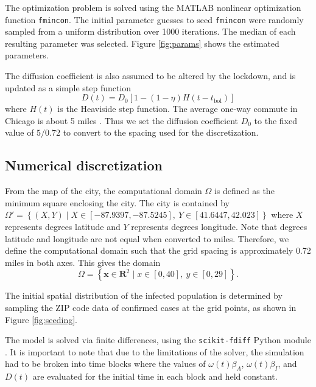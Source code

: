 \documentclass[11pt]{article}
\newcommand{\R}{\mathbf{R}}
\renewcommand\vec{\mathbf}
\begin{document}
		The optimization problem is solved using the MATLAB nonlinear optimization function \verb|fmincon|.
		The initial parameter guesses to seed \verb|fmincon| were randomly sampled from a uniform distribution over 1000 iterations.
		The median of each resulting parameter was selected.
		Figure \ref{fig:params} shows the estimated parameters.
		
		The diffusion coefficient is also assumed to be altered by the lockdown, and is updated as a simple step function
			\begin{equation} \label{eq:diffusion}
				D(t) = D_0 \left[ 1 - (1 - \eta) H (t - t_\mathrm{bol}) \right]
			\end{equation}
		where $H(t)$ is the Heaviside step function.
		The average one-way commute in Chicago is about 5 miles \cite{travel}.
		Thus we set the diffusion coefficient $D_0$ to the fixed value of $5 / 0.72$ to convert to the spacing used for the discretization.
	
	\subsection{Numerical discretization}
		From the map of the city, the computational domain $\Omega$ is defined as the minimum square enclosing the city.
		The city is contained by $\Omega' = \left\{ (X,Y) \mid X \in [-87.9397, -87.5245], \ Y \in [41.6447, 42.023] \right\}$ where $X$ represents degrees latitude and $Y$ represents degrees longitude.
		Note that degrees latitude and longitude are not equal when converted to miles.
		Therefore, we define the computational domain such that the grid spacing is approximately 0.72 miles in both axes.
		This gives the domain
		\begin{equation*} \label{eq:domain}
			\Omega = \left\{ \vec{x} \in \R^2 \mid x \in [0, 40], \ y \in [0, 29] \right\}.
		\end{equation*}
		
		The initial spatial distribution of the infected population is determined by sampling the ZIP code data of confirmed cases \cite{Chicago-zips} at the grid points, as shown in Figure \ref{fig:seeding}.
		
		The model is solved via finite differences, using the \verb|scikit-fdiff| Python module \cite{nicolas_cellier_2019_3236970}.
		It is important to note that due to the limitations of the solver, the simulation had to be broken into time blocks where the values of $\omega (t) \beta_A$, $\omega (t) \beta_I$, and $D(t)$ are evaluated for the initial time in each block and held constant.
	
\end{document}
